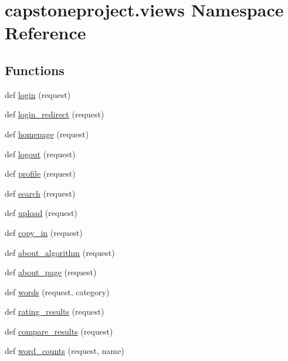 \hypertarget{namespacecapstoneproject_1_1views}{}\section{capstoneproject.\+views Namespace Reference}
\label{namespacecapstoneproject_1_1views}
\subsection*{Functions}
\begin{DoxyCompactItemize}
\item 
def \mbox{\hyperlink{namespacecapstoneproject_1_1views_a01b76b80484781d4941bf80644e0e6b3}{login}} (request)
\item 
def \mbox{\hyperlink{namespacecapstoneproject_1_1views_a4138b830a9b5f13d5b1457b283e2d8e5}{login\+\_\+redirect}} (request)
\item 
def \mbox{\hyperlink{namespacecapstoneproject_1_1views_a9319d58ed878e004d1f9eca04ce55c59}{homepage}} (request)
\item 
def \mbox{\hyperlink{namespacecapstoneproject_1_1views_a07599532865c8f2870b6cbf91cf00a28}{logout}} (request)
\item 
def \mbox{\hyperlink{namespacecapstoneproject_1_1views_a84e35a622ec043412f06e74fea5faa9e}{profile}} (request)
\item 
def \mbox{\hyperlink{namespacecapstoneproject_1_1views_af8c2155e11146bf5b527cdee0859f44a}{search}} (request)
\item 
def \mbox{\hyperlink{namespacecapstoneproject_1_1views_af47e5c830c3e892309d9e256f315e14f}{upload}} (request)
\item 
def \mbox{\hyperlink{namespacecapstoneproject_1_1views_aa623cff0d3f233b251fbbcc14e8aa86f}{copy\+\_\+in}} (request)
\item 
def \mbox{\hyperlink{namespacecapstoneproject_1_1views_aebf902e0c512912c97f62c7349714d4b}{about\+\_\+algorithm}} (request)
\item 
def \mbox{\hyperlink{namespacecapstoneproject_1_1views_ae4926974b5a54e75ad132ef6b6a68681}{about\+\_\+page}} (request)
\item 
def \mbox{\hyperlink{namespacecapstoneproject_1_1views_ac40142fdb38f6de08b00630753fd243a}{words}} (request, category)
\item 
def \mbox{\hyperlink{namespacecapstoneproject_1_1views_a2e8e189da407be2e8849d6712edf0776}{rating\+\_\+results}} (request)
\item 
def \mbox{\hyperlink{namespacecapstoneproject_1_1views_adcc34573c7064f83eb5e310efbb2c0c4}{compare\+\_\+results}} (request)
\item 
def \mbox{\hyperlink{namespacecapstoneproject_1_1views_acfe1fcc1fc3f0f4779b31f28830ee379}{word\+\_\+counts}} (request, name)
\end{DoxyCompactItemize}


